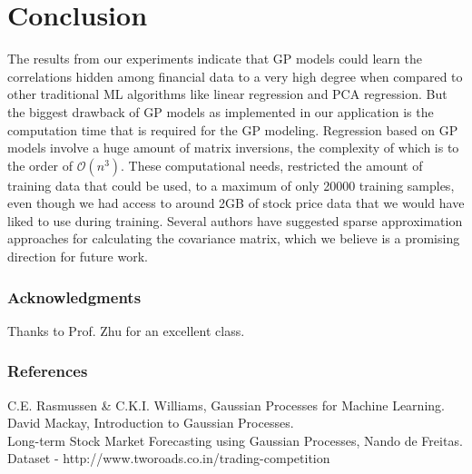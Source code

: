\documentclass{article} %
\begin{document}
\section{Conclusion}
The results from our experiments indicate that GP models could learn the correlations hidden among financial data to a very high degree when compared to other traditional ML algorithms like linear regression and PCA regression. But the biggest drawback of GP models as implemented in our application is the computation time that is required for the GP modeling. Regression based on GP models involve a huge amount of matrix inversions, the complexity of which is to the order of $\mathcal{O}(n^3)$. These computational needs, restricted the amount of training data that could be used, to a maximum of only 20000 training samples, even though we had access to around 2GB of stock price data that we would have liked to use during training. Several authors have suggested sparse approximation approaches for calculating the covariance matrix, which we believe is a promising direction for future work. 

\subsubsection*{Acknowledgments}
Thanks to Prof. Zhu for an excellent class.

\subsubsection*{References}
\small{
C.E. Rasmussen \& C.K.I. Williams, Gaussian Processes for Machine Learning. \\
David Mackay, Introduction to Gaussian Processes.\\
Long-term Stock Market Forecasting using Gaussian Processes, Nando de Freitas.
Dataset - http://www.tworoads.co.in/trading-competition}
\end{document}
